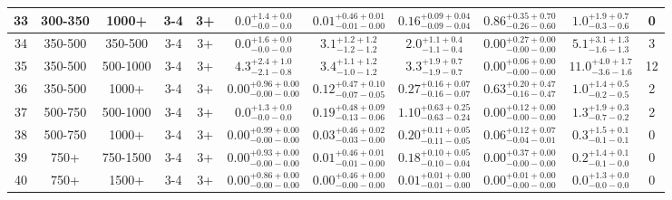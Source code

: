 \documentclass[11pt, oneside]{article}
\begin{document}
\begin{table}
{\begin{tabular}{ |c|c|c|c|c||c|c|c|c||c|c| }
33 & 300-350 & 1000+ & 3-4 & 3+ & $0.0^{+1.4+0.0}_{-0.0-0.0}$ & $0.01^{+0.46+0.01}_{-0.01-0.00}$ & $0.16^{+0.09+0.04}_{-0.09-0.04}$ & $0.86^{+0.35+0.70}_{-0.26-0.60}$ & $1.0^{+1.9+0.7}_{-0.3-0.6}$ & 0 \\ \hline
34 & 350-500 & 350-500 & 3-4 & 3+ & $0.0^{+1.6+0.0}_{-0.0-0.0}$ & $3.1^{+1.2+1.2}_{-1.2-1.2}$ & $2.0^{+1.1+0.4}_{-1.1-0.4}$ & $0.00^{+0.27+0.00}_{-0.00-0.00}$ & $5.1^{+3.1+1.3}_{-1.6-1.3}$ & 3 \\ \hline
35 & 350-500 & 500-1000 & 3-4 & 3+ & $4.3^{+2.4+1.0}_{-2.1-0.8}$ & $3.4^{+1.1+1.2}_{-1.0-1.2}$ & $3.3^{+1.9+0.7}_{-1.9-0.7}$ & $0.00^{+0.06+0.00}_{-0.00-0.00}$ & $11.0^{+4.0+1.7}_{-3.6-1.6}$ & 12 \\ \hline
36 & 350-500 & 1000+ & 3-4 & 3+ & $0.00^{+0.96+0.00}_{-0.00-0.00}$ & $0.12^{+0.47+0.10}_{-0.07-0.05}$ & $0.27^{+0.16+0.07}_{-0.16-0.07}$ & $0.63^{+0.20+0.47}_{-0.16-0.47}$ & $1.0^{+1.4+0.5}_{-0.2-0.5}$ & 2 \\ \hline
37 & 500-750 & 500-1000 & 3-4 & 3+ & $0.0^{+1.3+0.0}_{-0.0-0.0}$ & $0.19^{+0.48+0.09}_{-0.13-0.06}$ & $1.10^{+0.63+0.25}_{-0.63-0.24}$ & $0.00^{+0.12+0.00}_{-0.00-0.00}$ & $1.3^{+1.9+0.3}_{-0.7-0.2}$ & 2 \\ \hline
38 & 500-750 & 1000+ & 3-4 & 3+ & $0.00^{+0.99+0.00}_{-0.00-0.00}$ & $0.03^{+0.46+0.02}_{-0.03-0.00}$ & $0.20^{+0.11+0.05}_{-0.11-0.05}$ & $0.06^{+0.12+0.07}_{-0.04-0.01}$ & $0.3^{+1.5+0.1}_{-0.1-0.1}$ & 0 \\ \hline
39 & 750+ & 750-1500 & 3-4 & 3+ & $0.00^{+0.93+0.00}_{-0.00-0.00}$ & $0.01^{+0.46+0.01}_{-0.01-0.00}$ & $0.18^{+0.10+0.05}_{-0.10-0.04}$ & $0.00^{+0.37+0.00}_{-0.00-0.00}$ & $0.2^{+1.4+0.1}_{-0.1-0.0}$ & 0 \\ \hline
40 & 750+ & 1500+ & 3-4 & 3+ & $0.00^{+0.86+0.00}_{-0.00-0.00}$ & $0.00^{+0.46+0.00}_{-0.00-0.00}$ & $0.01^{+0.01+0.00}_{-0.01-0.00}$ & $0.00^{+0.01+0.00}_{-0.00-0.00}$ & $0.0^{+1.3+0.0}_{-0.0-0.0}$ & 0 \\ \hline
\end{tabular}}
\end{table}
\end{document}
